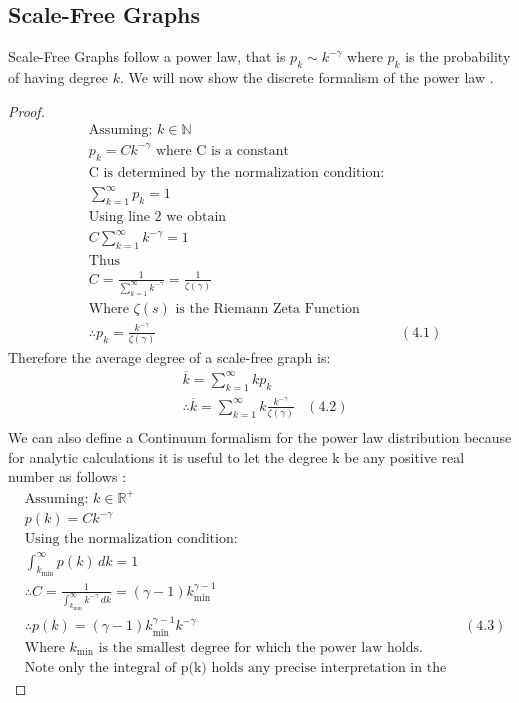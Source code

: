 \documentclass{article}
\begin{document}
        \subsection{Scale-Free Graphs}
        Scale-Free Graphs follow a power law, that is $p_{k} \sim k^{-\gamma}$ where $p_{k}$ is the probability of having degree $k$. We will now show the discrete formalism of the power law \parencite{barabasi2013network}.
        \begin{proof}
            \begin{align*}
                &\text{Assuming: } k\in \mathbb{N}\\
                &p_{k} = Ck^{-\gamma} \text{ where C is a constant}\\
                &\text{C is determined by the normalization condition: }\\
                &\sum_{k = 1}^{\infty}p_{k} = 1\\
                &\text{Using line 2 we obtain}\\
                &C\sum_{k=1}^{\infty}k^{-\gamma} = 1\\
                &\text{Thus}\\
                &C = \frac{1}{\sum_{k=1}^{\infty}k^{-\gamma}} = \frac{1}{\zeta(\gamma)}\\
                &\text{Where $\zeta(s)$ is the Riemann Zeta Function}\\
                &\therefore p_{k}=\frac{k^{-\gamma}}{\zeta(\gamma)} &(4.1)
            \end{align*}
            Therefore the average degree of a scale-free graph is:
            \begin{align*}
                &\overline{k} = \sum_{k=1}^{\infty}kp_{k}\\
                &\therefore \overline{k} = \sum_{k=1}^{\infty}k\frac{k^{-\gamma}}{\zeta(\gamma)} &(4.2)\\
            \end{align*}
            We can also define a Continuum formalism for the power law distribution because for analytic calculations it is useful to let the degree k be any positive real number as follows \parencite{barabasi2013network}:
            \begin{align*}
                &\text{Assuming: } k\in \mathbb{R}^{+}\\
                &p(k) = Ck^{-\gamma}\\
                &\text{Using the normalization condition:}\\
                &\int_{k_{\text{min}}}^{\infty}p(k) \,dk = 1\\
                &\therefore C = \frac{1}{\int_{k_{\text{min}}}^{\infty}k^{-\gamma} \,dk} = (\gamma -1)k_{\text{min}}^{\gamma-1}\\
                &\therefore p(k) = (\gamma -1)k_{\text{min}}^{\gamma-1}k^{-\gamma}  &(4.3)\\
                &\text{Where $k_{\text{min}}$ is the smallest degree for which the power law holds.}\\
                &\text{Note only the integral of p(k) holds any precise interpretation in the continuum formalism}
            \end{align*}
        \end{proof}
\end{document}
